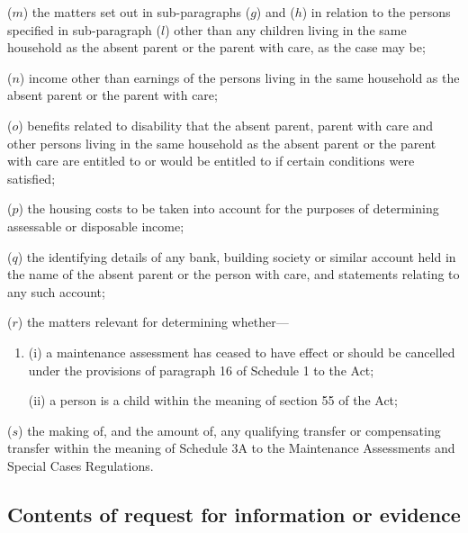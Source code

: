 \documentclass[a4paper,12pt]{article}
\begin{document}
\begin{enumerate}
($m$) the matters set out in sub-paragraphs ($g$) and ($h$) in relation to the persons specified in sub-paragraph ($l$) other than any children living in the same household as the absent parent or the parent with care, as the case may be;

($n$) income other than earnings of the persons living in the same household as the absent parent or the parent with care;

($o$) benefits related to disability that the absent parent, parent with care and other persons living in the same household as the absent parent or the parent with care are entitled to or would be entitled to if certain conditions were satisfied;

($p$) the housing costs to be taken into account for the purposes of determining assessable or disposable income;

($q$) the identifying details of any bank, building society or similar account held in the name of the absent parent or the person with care, and statements relating to any such account;

($r$) the matters relevant for determining whether—
\begin{enumerate}\item[]
(i) a maintenance assessment has ceased to have effect or should be cancelled under the provisions of paragraph 16 of Schedule 1 to the Act;

(ii) a person is a child within the meaning of section 55 of the Act;
\end{enumerate}

($s$) the making of, and the amount of, any qualifying transfer or compensating transfer within the meaning of Schedule 3A to the Maintenance Assessments and Special Cases Regulations.
\end{enumerate}


\subsection[3A. Contents of request for information or evidence]{Contents of request for information or evidence}
\end{document}

